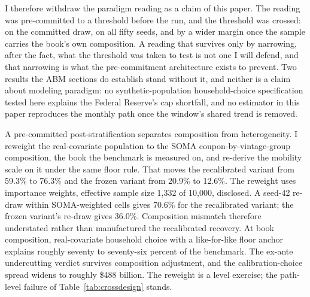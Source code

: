 \documentclass[12pt]{article}
\begin{document}
I therefore withdraw the paradigm reading as a claim of this paper. The reading was pre-committed to a threshold before the run, and the threshold was crossed: on the committed draw, on all fifty seeds, and by a wider margin once the sample carries the book's own composition. A reading that survives only by narrowing, after the fact, what the threshold was taken to test is not one I will defend, and that narrowing is what the pre-commitment architecture exists to prevent. Two results the ABM sections do establish stand without it, and neither is a claim about modeling paradigm: no synthetic-population household-choice specification tested here explains the Federal Reserve's cap shortfall, and no estimator in this paper reproduces the monthly path once the window's shared trend is removed.

A pre-committed post-stratification separates composition from heterogeneity. I reweight the real-covariate population to the SOMA coupon-by-vintage-group composition, the book the benchmark is measured on, and re-derive the mobility scale on it under the same floor rule. That moves the recalibrated variant from 59.3\% to 76.3\% and the frozen variant from 20.9\% to 12.6\%. The reweight uses importance weights, effective sample size 1{,}332 of 10{,}000, disclosed. A seed-42 re-draw within SOMA-weighted cells gives 70.6\% for the recalibrated variant; the frozen variant's re-draw gives 36.0\%. Composition mismatch therefore understated rather than manufactured the recalibrated recovery. At book composition, real-covariate household choice with a like-for-like floor anchor explains roughly seventy to seventy-six percent of the benchmark. The ex-ante undercutting verdict survives composition adjustment, and the calibration-choice spread widens to roughly \$488 billion. The reweight is a level exercise; the path-level failure of Table~\ref{tab:crossdesign} stands.
\end{document}
